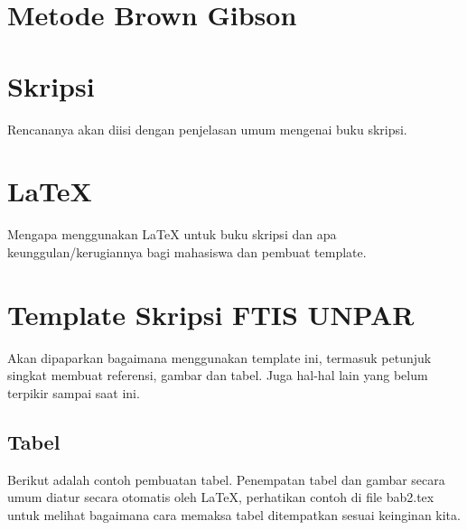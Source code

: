 \section{Metode Brown Gibson}







































\section{Skripsi}
\label{sec:skripsi} 
 
Rencananya akan diisi dengan penjelasan umum mengenai buku skripsi.


\section{\LaTeX}
\label{sec:latex}

Mengapa menggunakan \LaTeX{} untuk buku skripsi dan apa keunggulan/kerugiannya bagi mahasiswa dan pembuat template. 



\section{Template Skripsi FTIS UNPAR}
\label{sec:template}
 
Akan dipaparkan bagaimana menggunakan template ini, termasuk petunjuk singkat membuat referensi, gambar dan tabel.
Juga hal-hal lain yang belum terpikir sampai saat ini. 
 

\subsection{Tabel}  
Berikut adalah contoh pembuatan tabel. 
Penempatan tabel dan gambar secara umum diatur secara otomatis oleh \LaTeX{}, perhatikan contoh di file bab2.tex untuk melihat bagaimana cara memaksa tabel ditempatkan sesuai keinginan kita.

